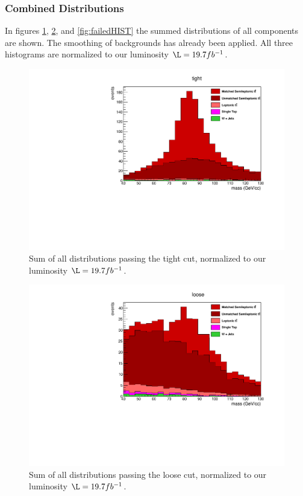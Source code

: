 \subsubsection{Combined Distributions}
In figures \ref{fig:tightHIST}, \ref{fig:looseHIST}, and \ref{fig:failedHIST} the summed distributions of all components are shown. The smoothing of backgrounds has already been applied. All three histograms are normalized to our luminosity $\L = 19.7 fb^{-1}$.
\begin{figure}[h!]
\centering
\includegraphics[scale=0.66]{EXO-12-024/figs/WtagSF/TOTAL_TIGHT.pdf}
\caption{Sum of all distributions passing the tight cut, normalized to our luminosity $\L = 19.7 fb^{-1}$.}\label{fig:tightHIST}
\end{figure}
\begin{figure}[h!]
\centering
\includegraphics[scale=0.66]{EXO-12-024/figs/WtagSF/TOTAL_LOOSE.pdf}
\caption{Sum of all distributions passing the loose cut, normalized to our luminosity $\L = 19.7 fb^{-1}$.}\label{fig:looseHIST}
\end{figure}
